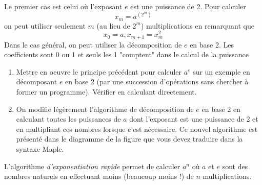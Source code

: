 Le premier cas est celui où l'exposant $e$ est une puissance de 2. Pour calculer
\begin{displaymath}
 x_m = a^{(2^m)}
\end{displaymath}
on peut utiliser seulement $m$ (au lieu de $2^m$) multiplications en remarquant que
\begin{displaymath}
 x_0=a , x_{m+1} = x_m^2
\end{displaymath}
Dans le cas général, on peut utiliser la décomposition de $e$ en base 2. Les coefficients sont 0 ou 1 et seuls les 1 "comptent" dans le calcul de la puissance
\begin{enumerate}
 \item Mettre en oeuvre le principe précédent pour calculer $a^e$ sur un exemple en décomposant $e$ en base 2 (par une succession d'opérations sans chercher à former un programme). Vérifier en calculant directement.
 \item On modifie légèrement l'algorithme de décomposition de $e$ en base 2 en calculant toutes les puissances de $a$ dont l'exposant est une puissance de 2 et en multipliant ces nombres lorsque c'est nécessaire. Ce nouvel algorithme est présenté dans le diagramme de la figure que vous devez traduire dans la syntaxe Maple.
\end{enumerate}
L'algorithme \emph{d'exponentiation rapide} permet de calculer $a^n$ où $a$ et $e$ sont des nombres naturels en effectuant moins (beaucoup moins !) de $n$ multiplications.


